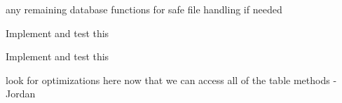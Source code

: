 \begin{DoxyRefList}
any remaining database functions for safe file handling if needed  
\item[\label{todo__todo000019}%
\hypertarget{todo__todo000019}{}%
Member \hyperlink{class_server_queue_aa8678274d8afa980b2995ed3f839a3f8}{Server\+Queue\+:\+:dequeue} (\hyperlink{class_protocol_1_1_packet}{Protocol\+::\+Packet} $\ast$packet)]Implement and test this  
\item[\label{todo__todo000020}%
\hypertarget{todo__todo000020}{}%
Member \hyperlink{class_server_queue_a8d0d64b34a8e2a342009b496bfe8b196}{Server\+Queue\+:\+:force\+Dequeue} (\hyperlink{class_protocol_1_1_packet}{Protocol\+::\+Packet} $\ast$packet)]Implement and test this  
\item[\label{todo__todo000021}%
\hypertarget{todo__todo000021}{}%
Member \hyperlink{class_table_widget_acf7df57ad87a0241daba9f96509ef4df}{Table\+Widget\+:\+:get\+Table\+As\+Flight\+Path} ()]look for optimizations here now that we can access all of the table methods -\/\+Jordan 
\end{DoxyRefList}